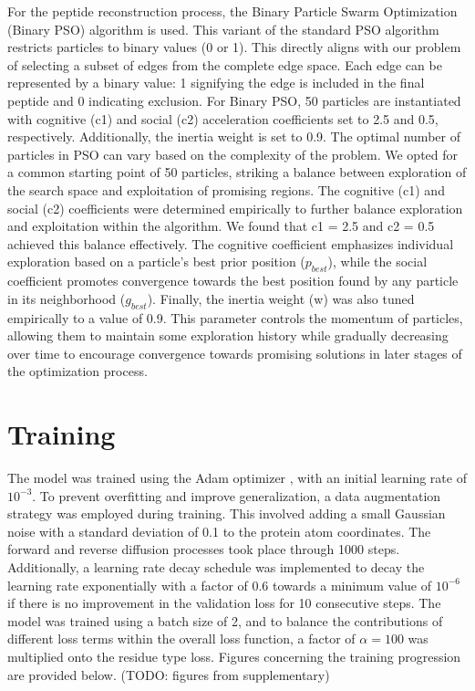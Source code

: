 For the peptide reconstruction process, the Binary Particle Swarm Optimization (Binary PSO) algorithm is used. This variant of the standard PSO algorithm restricts particles to binary values (0 or 1). This directly aligns with our problem of selecting a subset of edges from the complete edge space. Each edge can be represented by a binary value: 1 signifying the edge is included in the final peptide and 0 indicating exclusion. For Binary PSO, 50 particles are instantiated with cognitive (c1) and social (c2) acceleration coefficients set to 2.5 and 0.5, respectively. Additionally, the inertia weight is set to 0.9.
The optimal number of particles in PSO can vary based on the complexity of the problem. We opted for a common starting point of 50 particles, striking a balance between exploration of the search space and exploitation of promising regions. The cognitive (c1) and social (c2) coefficients were determined empirically to further balance exploration and exploitation within the algorithm. We found that c1 = 2.5 and c2 = 0.5 achieved this balance effectively. The cognitive coefficient emphasizes individual exploration based on a particle's best prior position ($p_{best}$), while the social coefficient promotes convergence towards the best position found by any particle in its neighborhood ($g_{best}$). Finally, the inertia weight (w) was also tuned empirically to a value of 0.9. This parameter controls the momentum of particles, allowing them to maintain some exploration history while gradually decreasing over time to encourage convergence towards promising solutions in later stages of the optimization process.

\section{Training}
The model was trained using the Adam optimizer \cite{kingma2014adam}, with an initial learning rate of $10^{-3}$. To prevent overfitting and improve generalization, a data augmentation strategy was employed during training. This involved adding a small Gaussian noise with a standard deviation of 0.1 to the protein atom coordinates. The forward and reverse diffusion processes took place through 1000 steps. Additionally, a learning rate decay schedule was implemented to decay the learning rate exponentially with a factor of 0.6 towards a minimum value of $10^{-6}$ if there is no improvement in the validation loss for 10 consecutive steps. The model was trained using a batch size of 2, and to balance the contributions of different loss terms within the overall loss function, a factor of $\alpha = 100$ was multiplied onto the residue type loss. Figures concerning the training progression are provided below. (TODO: figures from supplementary) \\

